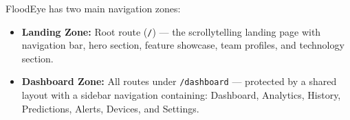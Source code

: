 FloodEye has two main navigation zones:

\begin{itemize}[leftmargin=1.5em]
  \item \textbf{Landing Zone:} Root route (\texttt{/\allowbreak{}}) — the scrollytelling landing page with navigation bar, hero section, feature showcase, team profiles, and technology section.
  \item \textbf{Dashboard Zone:} All routes under \texttt{/\allowbreak{}dashboard} — protected by a shared layout with a sidebar navigation containing: Dashboard, Analytics, History, Predictions, Alerts, Devices, and Settings.
\end{itemize}
